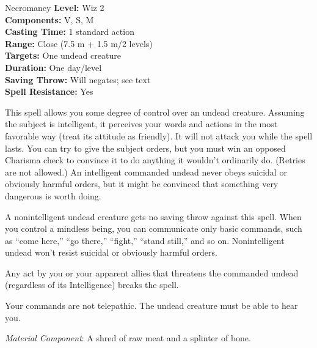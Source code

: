 {Necromancy}
{
	\textbf{Level:}
	Wiz 2\\
	\textbf{Components:}
	V, S, M\\
	\textbf{Casting Time:}
	1 standard action\\
	\textbf{Range:}
	Close (7.5 m + 1.5 m/2 levels)\\
	\textbf{Targets:}
	One undead creature\\
	\textbf{Duration:}
	One day/level\\
	\textbf{Saving Throw:}
	Will negates; see text\\
	\textbf{Spell Resistance:}
	Yes\\
}
{
	This spell allows you some degree of control over an undead creature. Assuming the subject is intelligent, it perceives your words and actions in the most favorable way (treat its attitude as friendly). It will not attack you while the spell lasts. You can try to give the subject orders, but you must win an opposed Charisma check to convince it to do anything it wouldn't ordinarily do. (Retries are not allowed.) An intelligent commanded undead never obeys suicidal or obviously harmful orders, but it might be convinced that something very dangerous is worth doing.

	A nonintelligent undead creature gets no saving throw against this spell. When you control a mindless being, you can communicate only basic commands, such as ``come here,'' ``go there,'' ``fight,'' ``stand still,'' and so on. Nonintelligent undead won't resist suicidal or obviously harmful orders.

	Any act by you or your apparent allies that threatens the commanded undead (regardless of its Intelligence) breaks the spell.

	Your commands are not telepathic. The undead creature must be able to hear you.

	\textit{Material Component}:
	A shred of raw meat and a splinter of bone.

}
